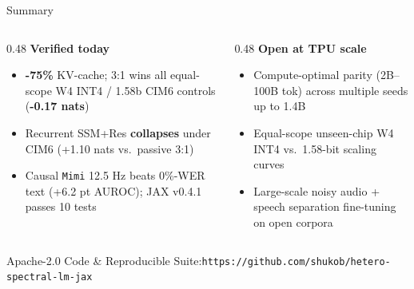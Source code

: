 \documentclass[aspectratio=169,10pt]{beamer}
\begin{document}
\begin{frame}{Summary}
  \vspace*{0.32cm}
  \begin{columns}[T,totalwidth=\textwidth]
    \begin{column}{0.48\textwidth}
      {\large\color{Teal}\textbf{Verified today}}\\[0.60em]
      \begin{itemize}\setlength{\itemsep}{0.68em}
        \item {\normalsize \textbf{-75\%} KV-cache; 3:1 wins all equal-scope W4 INT4 / 1.58b CIM6 controls (\textbf{-0.17 nats})}
        \item {\normalsize Recurrent SSM+Res \textbf{collapses} under CIM6 (+1.10 nats vs.\ passive 3:1)}
        \item {\normalsize Causal \texttt{Mimi} 12.5 Hz beats 0\%-WER text (+6.2 pt AUROC); JAX v0.4.1 passes 10 tests}
      \end{itemize}
    \end{column}
    \begin{column}{0.48\textwidth}
      {\large\color{Crimson}\textbf{Open at TPU scale}}\\[0.60em]
      \begin{itemize}\setlength{\itemsep}{0.68em}
        \item {\normalsize Compute-optimal parity (2B--100B tok) across multiple seeds up to 1.4B}
        \item {\normalsize Equal-scope unseen-chip W4 INT4 vs.\ 1.58-bit scaling curves}
        \item {\normalsize Large-scale noisy audio + speech separation fine-tuning on open corpora}
      \end{itemize}
    \end{column}
  \end{columns}
  \vspace*{0.80cm}
  \begin{center}
    {\footnotesize\color{Muted} Apache-2.0 Code \& Reproducible Suite:\quad \texttt{https://github.com/shukob/hetero-spectral-lm-jax}}
  \end{center}
\end{frame}
\end{document}

